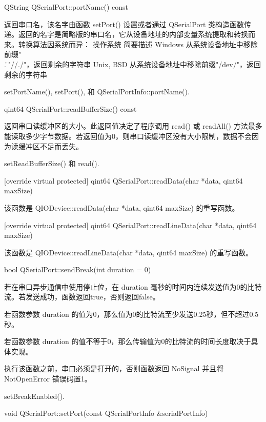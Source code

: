 QString QSerialPort::portName() const

返回串口名，该名字由函数 setPort() 设置或者通过 QSerialPort 类构造函数传递。返回的名字是简略版的串口名，它从设备地址的内部变量系统提取和转换而来。转换算法因系统而异：
操作系统 	简要描述
Windows 	从系统设备地址中移除前缀"\\.\"或"//./"，返回剩余的字符串
Unix, BSD 	从系统设备地址中移除前缀"/dev/"，返回剩余的字符串

\begin{seeAlso}
setPortName(), setPort(), 和 QSerialPortInfo::portName().
\end{seeAlso}

qint64 QSerialPort::readBufferSize() const

返回串口读缓冲区的大小。此返回值决定了程序调用 read() 或 readAll() 方法最多能读取多少字节数据。若返回值为0，则串口读缓冲区没有大小限制，数据不会因为读缓冲区不足而丢失。

\begin{seeAlso}
setReadBufferSize() 和 read().
\end{seeAlso}

[override virtual protected] qint64 QSerialPort::readData(char *data, qint64 maxSize)

该函数是 QIODevice::readData(char *data, qint64 maxSize) 的重写函数。

[override virtual protected] qint64 QSerialPort::readLineData(char *data, qint64 maxSize)

该函数是 QIODevice::readLineData(char *data, qint64 maxSize) 的重写函数。

bool QSerialPort::sendBreak(int duration = 0)

若在串口异步通信中使用停止位，在 duration 毫秒的时间内连续发送值为0的比特流。若发送成功，函数返回true，否则返回false。

若函数参数 duration 的值为0，那么值为0的比特流至少发送0.25秒，但不超过0.5秒。

若函数参数 duration 的值不等于0，那么传输值为0的比特流的时间长度取决于具体实现。

\begin{notice}
执行该函数之前，串口必须是打开的，否则函数返回 NoSignal 并且将 NotOpenError 错误码置1。
\end{notice}

\begin{seeAlso}
setBreakEnabled().
\end{seeAlso}

void QSerialPort::setPort(const QSerialPortInfo \&serialPortInfo)

